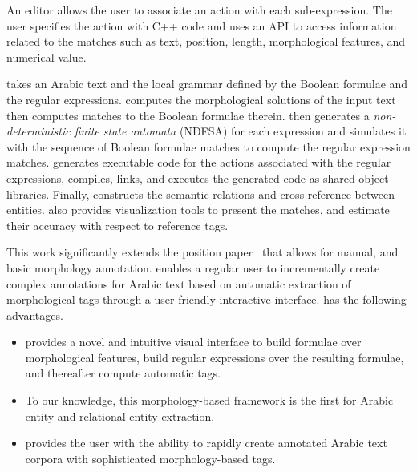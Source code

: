 An editor allows the user to associate an action with each sub-expression.
The user specifies the action with C++ code and uses an API to access information 
related to the matches such as text, position, length, morphological features, 
and numerical value.
%

\framework takes an Arabic text and the local grammar defined by the 
Boolean formulae and the regular expressions.
\framework computes the morphological solutions of the 
input text then computes matches to the Boolean formulae therein.
\framework then generates a {\em non-deterministic finite state 
automata} (NDFSA) for each expression and simulates it with the 
sequence of Boolean formulae matches to compute the regular 
expression matches. 
\framework generates executable code for the actions associated with
the regular expressions, 
compiles, links, and executes the generated code 
as shared object libraries.
Finally, \framework constructs the semantic relations and 
cross-reference between entities.
\framework also provides visualization tools to present the matches, 
and estimate their accuracy with respect to reference tags.

This work significantly extends the position paper~\cite{JaZaMatar} 
that allows for manual, and basic morphology annotation.
\framework enables a regular user to incrementally create 
complex annotations for Arabic text based on automatic 
extraction of morphological tags through a user friendly interactive interface. 
\framework has the following advantages.
\begin{itemize}
  \item \framework provides a novel and intuitive visual interface to build formulae over morphological features, 
    build regular expressions over the resulting formulae, and thereafter compute automatic tags.
  \item To our knowledge, this morphology-based framework is the first for Arabic entity and relational entity extraction.
  \item \framework provides the user with the ability to rapidly create annotated Arabic text corpora with sophisticated morphology-based tags.
\end{itemize}

